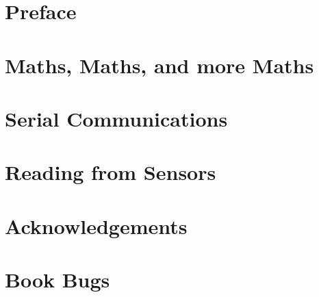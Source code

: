 \documentclass[a5paper,oneside]{scrbook}
\begin{document}


\tableofcontents

\chapter*{Preface\label{preface}}




% 


\chapter{Maths, Maths, and more Maths}

\chapter{Serial Communications}



\chapter{Reading from Sensors}


%

\chapter{Acknowledgements\label{acknowledgements}}


\chapter{Book Bugs\label{bugs}}

\end{document}
